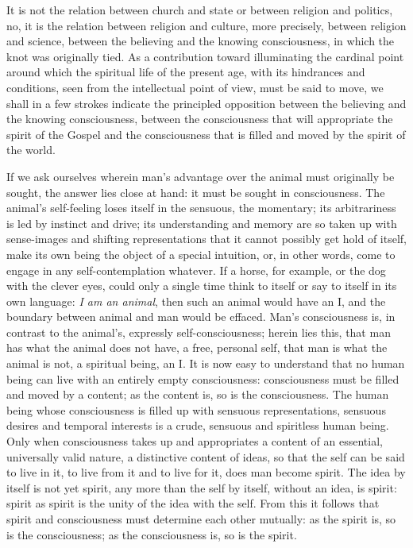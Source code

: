 \documentclass[12pt]{book}
\newcommand{\opage}[1]{\marginnote{\footnotesize\textit{[#1]}}}
\begin{document}
It is not the relation between church and state or between religion and
politics, no, it is the relation between religion and culture, more
precisely, between religion and science, between the believing and the
knowing consciousness, in which the knot was originally tied. As a
contribution toward illuminating the cardinal point around which the
spiritual life of the present age, with its hindrances and conditions,
seen from the intellectual point of view, must be said to move, we shall
in a few strokes indicate the principled opposition between the
believing and the knowing consciousness, between the consciousness that
will appropriate the spirit of the Gospel
\opage{40}\setcounter{footnote}{0}%
and the consciousness that is filled and moved by the spirit of the
world.

If we ask ourselves wherein man's advantage over the animal must
originally be sought, the answer lies close at hand: it must be sought
in consciousness. The animal's self-feeling loses itself in the sensuous,
the momentary; its arbitrariness is led by instinct and drive; its
understanding and memory are so taken up with sense-images and shifting
representations that it cannot possibly get hold of itself, make its
own being the object of a special intuition, or, in other words, come to
engage in any self-contemplation whatever. If a horse, for example, or
the dog with the clever eyes, could only a single time think to itself
or say to itself in its own language: \textit{I am an animal}, then such
an animal would have an I, and the boundary between animal and man would
be effaced. Man's consciousness is, in contrast to the animal's,
expressly self-consciousness; herein lies this, that man has what the
animal does not have, a free, personal self, that man is what the animal
is not, a spiritual being, an I. It is now easy to understand that no
human being can live with an entirely empty consciousness: consciousness
must be filled and moved by a content; as the content is, so is the
consciousness. The human being whose consciousness is filled up with
sensuous representations, sensuous desires and temporal interests is a
crude, sensuous and spiritless human being. Only when consciousness takes
up and appropriates a content of an essential, universally valid nature,
a distinctive content of ideas, so that the self can be said to live in
it, to live from it and to live for it, does man become spirit. The idea
by itself is not yet spirit, any more than the self by itself, without
an idea, is spirit: spirit as spirit is the unity of the idea with the
self. From this it follows that spirit and consciousness must determine
each other mutually: as the spirit is,
\opage{41}\setcounter{footnote}{0}%
so is the consciousness; as the consciousness is, so is the spirit.
\end{document}
